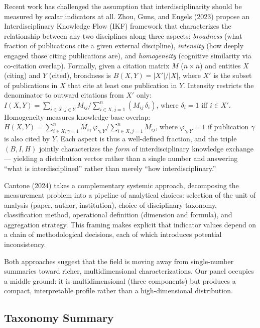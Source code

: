 \documentclass[
]{article}
\begin{document}
Recent work has challenged the assumption that interdisciplinarity
should be measured by scalar indicators at all. Zhou, Guns, and Engels
(2023) propose an Interdisciplinary Knowledge Flow (IKF) framework that
characterizes the relationship between any two disciplines along three
aspects: \emph{broadness} (what fraction of publications cite a given
external discipline), \emph{intensity} (how deeply engaged those citing
publications are), and \emph{homogeneity} (cognitive similarity via
co-citation overlap). Formally, given a citation matrix \(M\)
(\(n \times n\)) and entities \(X\) (citing) and \(Y\) (cited),
broadness is \(B(X,Y) = |X'|/|X|\), where \(X'\) is the subset of
publications in \(X\) that cite at least one publication in \(Y\).
Intensity restricts the denominator to outward citations from \(X'\)
only:
\(I(X,Y) = \sum_{i \in X, j \in Y} M_{ij} / \sum_{i \in X, j=1}^{n} (M_{ij}\,\delta_i)\),
where \(\delta_i = 1\) iff \(i \in X'\). Homogeneity measures
knowledge-base overlap:
\(H(X,Y) = \sum_{i \in X, \gamma=1}^{n} M_{i\gamma}\,\varphi_{\gamma,Y} / \sum_{i \in X, j=1}^{n} M_{ij}\),
where \(\varphi_{\gamma,Y} = 1\) if publication \(\gamma\) is also cited
by \(Y\). Each aspect is thus a well-defined fraction, and the triple
\((B, I, H)\) jointly characterizes the \emph{form} of interdisciplinary
knowledge exchange --- yielding a distribution vector rather than a
single number and answering ``what is interdisciplined'' rather than
merely ``how interdisciplinary.''

Cantone (2024) takes a complementary systemic approach, decomposing the
measurement problem into a pipeline of analytical choices: selection of
the unit of analysis (paper, author, institution), choice of
disciplinary taxonomy, classification method, operational definition
(dimension and formula), and aggregation strategy. This framing makes
explicit that indicator values depend on a chain of methodological
decisions, each of which introduces potential inconsistency.

Both approaches suggest that the field is moving away from single-number
summaries toward richer, multidimensional characterizations. Our panel
occupies a middle ground: it is multidimensional (three components) but
produces a compact, interpretable profile rather than a high-dimensional
distribution.

\hypertarget{taxonomy-summary}{%
\subsection{Taxonomy Summary}\label{taxonomy-summary}}
\end{document}
